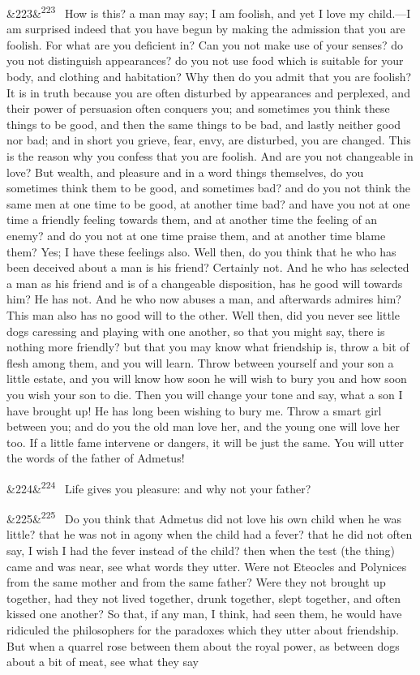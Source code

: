 \documentclass[12pt]{article}
\newcommand{\para}[1][]{\par\noindent\ifx&#1&\else\textsuperscript{\footnotesize #1}~\fi}
\begin{document}
\para[223] How is this? a man may say; I am foolish, and yet I love my child.—I am surprised indeed that you have begun by making the admission that you are foolish. For what are you deficient in? Can you not make use of your senses? do you not distinguish appearances? do you not use food which is suitable for your body, and clothing and habitation? Why then do you admit that you are foolish? It is in truth because you are often disturbed by appearances and perplexed, and their power of persuasion often conquers you; and sometimes you think these things to be good, and then the same things to be bad, and lastly neither good nor bad; and in short you grieve, fear, envy, are disturbed, you are changed. This is the reason why you confess that you are foolish. And are you not changeable in love? But wealth, and pleasure and in a word things themselves, do you sometimes think them to be good, and sometimes bad? and do you not think the same men at one time to be good, at another time bad? and have you not at one time a friendly feeling towards them, and at another time the feeling of an enemy? and do you not at one time praise them, and at another time blame them? Yes; I have these feelings also. Well then, do you think that he who has been deceived about a man is his friend? Certainly not. And he who has selected a man as his friend and is of a changeable disposition, has he good will towards him? He has not. And he who now abuses a man, and afterwards admires him? This man also has no good will to the other. Well then, did you never see little dogs caressing and playing with one another, so that you might say, there is nothing more friendly? but that you may know what friendship is, throw a bit of flesh among them, and you will learn. Throw between yourself and your son a little estate, and you will know how soon he will wish to bury you and how soon you wish your son to die. Then you will change your tone and say, what a son I have brought up! He has long been wishing to bury me. Throw a smart girl between you; and do you the old man love her, and the young one will love her too. If a little fame intervene or dangers, it will be just the same. You will utter the words of the father of Admetus!

\para[224] Life gives you pleasure: and why not your father?

\para[225] Do you think that Admetus did not love his own child when he was little? that he was not in agony when the child had a fever? that he did not often say, I wish I had the fever instead of the child? then when the test (the thing) came and was near, see what words they utter. Were not Eteocles and Polynices from the same mother and from the same father? Were they not brought up together, had they not lived together, drunk together, slept together, and often kissed one another? So that, if any man, I think, had seen them, he would have ridiculed the philosophers for the paradoxes which they utter about friendship. But when a quarrel rose between them about the royal power, as between dogs about a bit of meat, see what they say
\end{document}
